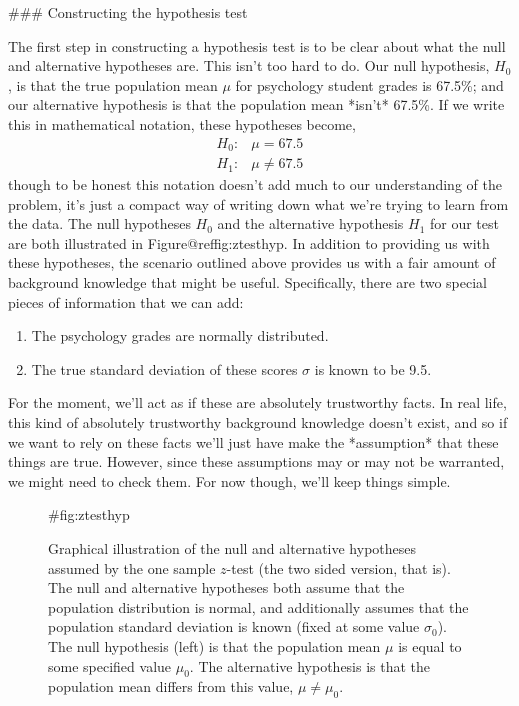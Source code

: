 ### Constructing the hypothesis test

The first step in constructing a hypothesis test is to be clear about what the null and alternative hypotheses are. This isn't too hard to do. Our null hypothesis, $H_0$, is that the true population mean $\mu$ for psychology student grades is 67.5\%; and our alternative hypothesis is that the population mean *isn't* 67.5\%. If we write this in mathematical notation, these hypotheses become,
$$
\begin{array}{ll}
H_0: & \mu = 67.5 \\
H_1: & \mu \neq 67.5
\end{array}
$$
though to be honest this notation doesn't add much to our understanding of the problem, it's just a compact way of writing down what we're trying to learn from the data. The null hypotheses $H_0$ and the alternative hypothesis $H_1$ for our test are both illustrated in Figure@reffig:ztesthyp. In addition to providing us with these hypotheses, the scenario outlined above provides us with a fair amount of background knowledge that might be useful. Specifically, there are two special pieces of information that we can add:
\begin{enumerate}
\item The psychology grades are normally distributed.
\item The true standard deviation of these scores $\sigma$ is known to be 9.5.
\end{enumerate}
For the moment, we'll act as if these are absolutely trustworthy facts. In real life, this kind of absolutely trustworthy background knowledge doesn't exist, and so if we want to rely on these facts we'll just have make the *assumption* that these things are true. However, since these assumptions may or may not be warranted, we might need to check them. For now though, we'll keep things simple.


\begin{figure}
\begin{center}
\caption{Graphical illustration of the null and alternative hypotheses assumed by the one sample $z$-test (the two sided version, that is). The null and alternative hypotheses both assume that the population distribution is normal, and additionally assumes that the population standard deviation is known (fixed at some value $\sigma_0$). The null hypothesis (left) is that the population mean $\mu$ is equal to some specified value $\mu_0$. The alternative hypothesis is that the population mean differs from this value, $\mu \neq \mu_0$.}
\HR
{#fig:ztesthyp}
\end{center}
\end{figure}




